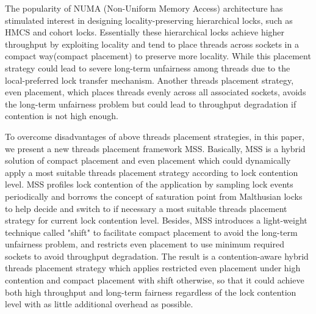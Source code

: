 \begin{englishabstract}

The popularity of NUMA (Non-Uniform Memory Access) architecture has stimulated interest in designing locality-preserving hierarchical locks, such as HMCS and cohort locks. Essentially these hierarchical locks achieve higher throughput by exploiting locality and tend to place threads across sockets in a compact way(compact placement) to preserve more locality. While this placement strategy could lead to severe long-term unfairness among threads due to the local-preferred lock transfer mechanism. Another threads placement strategy, even placement, which places threads evenly across all associated sockets, avoids the long-term unfairness problem but could lead to throughput degradation if contention is not high enough.

To overcome disadvantages of above threads placement strategies, in this paper, we present a new threads placement framework MSS. Basically, MSS is a hybrid solution of compact placement and even placement which could dynamically apply a most suitable threads placement strategy according to lock contention level. MSS profiles lock contention of the application by sampling lock events periodically and borrows the concept of saturation point from Malthusian locks to help decide and switch to if necessary a most suitable threads placement strategy for current lock contention level. Besides, MSS introduces a light-weight technique called "shift" to facilitate compact placement to avoid the long-term unfairness problem, and restricts even placement to use minimum required sockets to avoid throughput degradation. The result is a contention-aware hybrid threads placement strategy which applies restricted even placement under high contention and compact placement with shift otherwise, so that it could achieve both high throughput and long-term fairness regardless of the lock contention level with as little additional overhead as possible.

\end{englishabstract}

